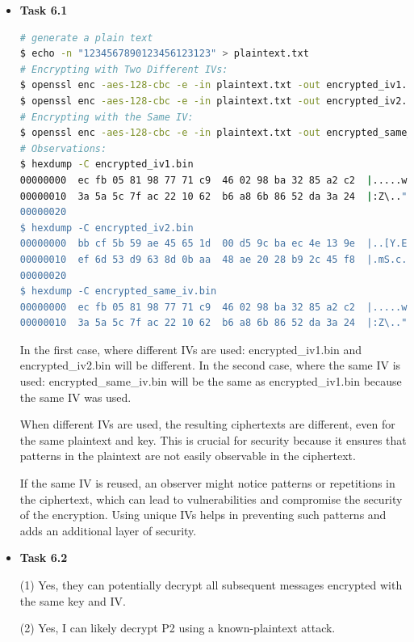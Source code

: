 \documentclass[a4paper]{article}
\begin{document}
\begin{itemize}
    \item \textbf{Task 6.1} 
\begin{lstlisting}[caption={TASK\ 2.6.1\ Command\ Lines},label={lst:task2.6.1},language=BASH,breaklines=true]
# generate a plain text
$ echo -n "1234567890123456123123" > plaintext.txt
# Encrypting with Two Different IVs:
$ openssl enc -aes-128-cbc -e -in plaintext.txt -out encrypted_iv1.bin -K 00112233445566778889aabbccddeeff -iv 0102030405060708
$ openssl enc -aes-128-cbc -e -in plaintext.txt -out encrypted_iv2.bin -K 00112233445566778889aabbccddeeff -iv 1122334455667788
# Encrypting with the Same IV:
$ openssl enc -aes-128-cbc -e -in plaintext.txt -out encrypted_same_iv.bin -K 00112233445566778889aabbccddeeff -iv 0102030405060708
# Observations:
$ hexdump -C encrypted_iv1.bin
00000000  ec fb 05 81 98 77 71 c9  46 02 98 ba 32 85 a2 c2  |.....wq.F...2...|
00000010  3a 5a 5c 7f ac 22 10 62  b6 a8 6b 86 52 da 3a 24  |:Z\..".b..k.R.:$|
00000020
$ hexdump -C encrypted_iv2.bin
00000000  bb cf 5b 59 ae 45 65 1d  00 d5 9c ba ec 4e 13 9e  |..[Y.Ee......N..|
00000010  ef 6d 53 d9 63 8d 0b aa  48 ae 20 28 b9 2c 45 f8  |.mS.c...H. (.,E.|
00000020
$ hexdump -C encrypted_same_iv.bin
00000000  ec fb 05 81 98 77 71 c9  46 02 98 ba 32 85 a2 c2  |.....wq.F...2...|
00000010  3a 5a 5c 7f ac 22 10 62  b6 a8 6b 86 52 da 3a 24  |:Z\..".b..k.R.:$|
\end{lstlisting}   
In the first case, where different IVs are used: encrypted\_iv1.bin and encrypted\_iv2.bin will be different. In the second case, where the same IV is used: encrypted\_same\_iv.bin will be the same as encrypted\_iv1.bin because the same IV was used.

When different IVs are used, the resulting ciphertexts are different, even for the same plaintext and key. This is crucial for security because it ensures that patterns in the plaintext are not easily observable in the ciphertext.

If the same IV is reused, an observer might notice patterns or repetitions in the ciphertext, which can lead to vulnerabilities and compromise the security of the encryption. Using unique IVs helps in preventing such patterns and adds an additional layer of security.
    \item \textbf{Task 6.2} 
    
    (1) Yes, they can potentially decrypt all subsequent messages encrypted with the same key and IV.

    (2) Yes, I can likely decrypt P2 using a known-plaintext attack.
   

\end{itemize}
\end{document}
